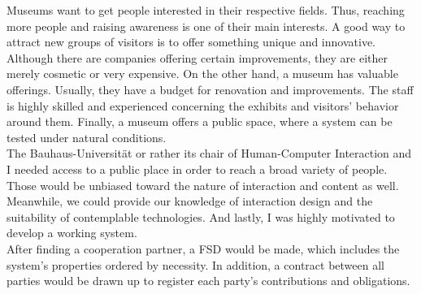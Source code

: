 Museums want to get people interested in their respective fields. Thus, reaching more people and raising awareness is one of their main interests. A good way to attract new groups of visitors is to offer something unique and innovative. Although there are companies offering certain improvements, they are either merely cosmetic or very expensive. On the other hand, a museum has valuable offerings. Usually, they have a budget for renovation and improvements. The staff is highly skilled and experienced concerning the exhibits and visitors' behavior around them. Finally, a museum offers a public space, where a system can be tested under natural conditions.
\\ 
The Bauhaus-Universität or rather its chair of Human-Computer Interaction and I needed access to a public place in order to reach a broad variety of people. Those would be unbiased toward the nature of interaction and content as well. Meanwhile, we could provide our knowledge of interaction design and the suitability of contemplable technologies. And lastly, I was highly motivated to develop a working system.
\\
After finding a cooperation partner, a \ac{FSD} would be made, which includes the system's properties ordered by necessity. In addition, a contract between all parties would be drawn up to register each party's contributions and obligations.


